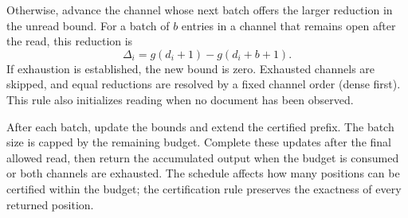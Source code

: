 Otherwise, advance the channel whose next batch offers the larger reduction in the unread bound. For a batch of \(b\) entries in a channel that remains open after the read, this reduction is \begin{equation}
\Delta_i=g(d_i+1)-g(d_i+b+1).
\label{eq:drop}
\end{equation} If exhaustion is established, the new bound is zero. Exhausted channels are skipped, and equal reductions are resolved by a fixed channel order (dense first). This rule also initializes reading when no document has been observed.

After each batch, update the bounds and extend the certified prefix. The batch size is capped by the remaining budget. Complete these updates after the final allowed read, then return the accumulated output when the budget is consumed or both channels are exhausted. The schedule affects how many positions can be certified within the budget; the certification rule preserves the exactness of every returned position.
